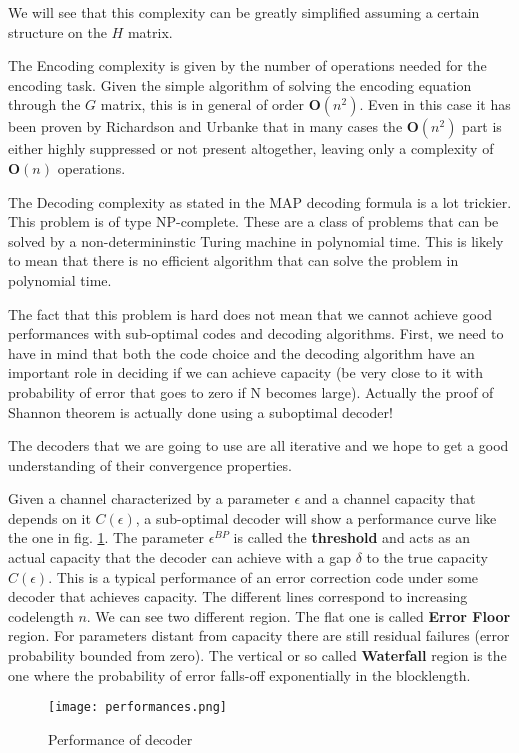 We will see that this complexity can be greatly simplified assuming a certain structure on the $H$ matrix.

The Encoding complexity is given by the number of operations needed for the encoding task. Given the simple algorithm of solving the encoding equation through the $G$ matrix, this is in general of order $\mathbf{O}(n^2)$. Even in this case it has been proven by Richardson and Urbanke that in many cases the $\mathbf{O}(n^2)$ part is  either highly suppressed or not present altogether, leaving only a complexity of $\mathbf{O}(n)$ operations.

The Decoding complexity as stated in the MAP decoding formula is a lot trickier. This problem is of type NP-complete. These are a class of problems that can be solved by a non-determininstic Turing machine in polynomial time. This is likely to mean that there is no efficient algorithm that can solve the problem in polynomial time.

The fact that this problem is hard does not mean that we cannot achieve good performances with sub-optimal codes and decoding algorithms. First, we need to have in mind that both the code choice and the decoding algorithm have an important role in deciding if we can achieve capacity (be very close to it with probability of error that goes to zero if N becomes large). Actually the proof of Shannon theorem is actually done using a suboptimal decoder!

The decoders that we are going to use are all iterative and we hope to get a good understanding of their convergence properties.

Given a channel characterized by a parameter $\epsilon$ and a channel capacity that depends on it $C(\epsilon)$, a sub-optimal decoder will show a performance curve like the one in fig. \ref{fig:decoder_perf}. The parameter $\epsilon^{BP}$ is called the \textbf{threshold} and acts as an actual capacity that the decoder can achieve with a gap $\delta$ to the true capacity $C(\epsilon)$. This is a typical performance of an error correction code under some decoder that achieves capacity. The different lines correspond to increasing codelength $n$. We can see two different region. The flat one is called \textbf{Error Floor} region. For parameters distant from capacity there are still residual failures (error probability bounded from zero). The vertical or so called \textbf{Waterfall} region is the one where the probability of error falls-off exponentially in the blocklength.

\begin{figure}
	\begin{center}
		\texttt{[image: performances.png]} \label{fig:decoder_perf}
		\caption{Performance of decoder}
	\end{center}
\end{figure}
